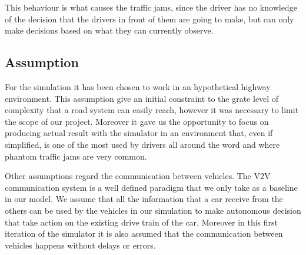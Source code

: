 This behaviour is what causes the traffic jams, since the driver has no knowledge of the decision that the drivers in front of them are going to make, but can only make decisions based on what they can currently observe.\cite{HumanBehaviour}

\subsection{Assumption}
For the simulation it has been chosen to work in an hypothetical highway environment. This assumption give an initial constraint to the grate level of complexity that a road system can easily reach, however it was necessary to limit the scope of our project. Moreover it gave us the opportunity to focus on producing actual result with the simulator in an environment that, even if simplified, is one of the most used by drivers all around the word and where phantom traffic jams are very common.

Other assumptions regard the communication between vehicles. The V2V communication system is a well defined paradigm that we only take as a baseline in our model. We assume that all the information that a car receive from the others can be used by the vehicles in our simulation to make autonomous decision that take action on the existing drive train of the car. 
Moreover in this first iteration of the simulator it is also assumed that the communication between vehicles happens without delays or errors. 